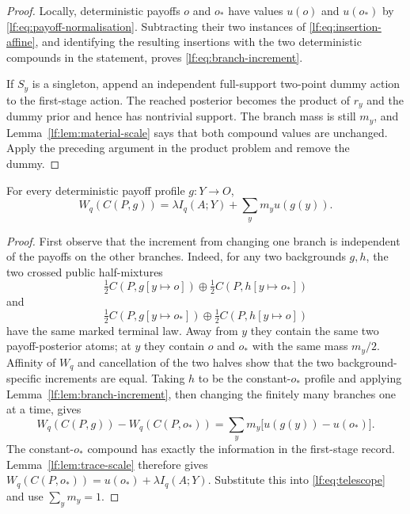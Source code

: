 \begin{proof}
Locally, deterministic payoffs $o$ and $o_\ast$ have values $u(o)$ and $u(o_\ast)$ by
\eqref{lf:eq:payoff-normalisation}.  Subtracting their two instances of
\eqref{lf:eq:insertion-affine}, and identifying the resulting insertions with
the two deterministic compounds in the statement, proves
\eqref{lf:eq:branch-increment}.

If $S_y$ is a singleton, append an independent full-support two-point dummy
action to the first-stage action.  The reached posterior becomes the product of
$r_y$ and the dummy prior and hence has nontrivial support.  The branch mass is
still $m_y$, and Lemma~\ref{lf:lem:material-scale} says that both compound
values are unchanged.  Apply the preceding argument in the product problem and
remove the dummy.
\end{proof}

\begin{lemma}\label{lf:lem:deterministic-assembly}
For every deterministic payoff profile $g:Y\to O$,
\begin{equation}
W_q(C(P,g))
=\lambda I_q(A;Y)+\sum_y m_y u(g(y)).
\label{lf:eq:deterministic-assembly}
\end{equation}
\end{lemma}

\begin{proof}
First observe that the increment from changing one branch is independent of
the payoffs on the other branches.  Indeed, for any two backgrounds $g,h$, the
two crossed public half-mixtures
\[
\tfrac12 C(P,g[y\mapsto o])
\oplus\tfrac12 C(P,h[y\mapsto o_\ast])
\]
and
\[
\tfrac12 C(P,g[y\mapsto o_\ast])
\oplus\tfrac12 C(P,h[y\mapsto o])
\]
have the same marked terminal law.  Away from $y$ they contain the same two
payoff-posterior atoms; at $y$ they contain $o$ and $o_\ast$ with the same mass
$m_y/2$.  Affinity of $W_q$ and cancellation of the two halves show that the
two background-specific increments are equal.  Taking
$h$ to be the constant-$o_\ast$ profile and applying
Lemma~\ref{lf:lem:branch-increment}, then changing the finitely many branches
one at a time, gives
\begin{equation}
W_q(C(P,g))-W_q(C(P,o_\ast))
=\sum_y m_y\bigl[u(g(y))-u(o_\ast)\bigr].
\label{lf:eq:telescope}
\end{equation}
The constant-$o_\ast$ compound has exactly the information in the
first-stage record.  Lemma~\ref{lf:lem:trace-scale} therefore gives
$W_q(C(P,o_\ast))=u(o_\ast)+\lambda I_q(A;Y)$.  Substitute this into
\eqref{lf:eq:telescope} and use $\sum_y m_y=1$.
\end{proof}

